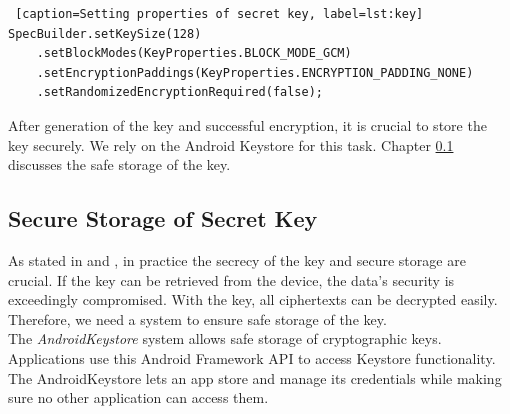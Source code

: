 \begin{lstlisting} [caption=Setting properties of secret key, label=lst:key]
SpecBuilder.setKeySize(128)
    .setBlockModes(KeyProperties.BLOCK_MODE_GCM)
    .setEncryptionPaddings(KeyProperties.ENCRYPTION_PADDING_NONE)
    .setRandomizedEncryptionRequired(false);
\end{lstlisting}


After generation of the key and successful encryption, it is crucial to store the key securely. We rely on the Android Keystore for this task. Chapter \ref{arch_keystore} discusses the safe storage of the key.




\subsection{Secure Storage of Secret Key} \label{arch_keystore}
As stated in \cite{dworkin2007sp} and \cite{DBLP:conf/ccs/CooijmansRP14},  in practice the secrecy of the key and secure storage are crucial. If the key can be retrieved from the device, the data's security is exceedingly compromised. With the key, all ciphertexts can be decrypted easily. Therefore, we need a system to ensure safe storage of the key. \\

The \textit{AndroidKeystore} system allows safe storage of cryptographic keys. Applications use this Android Framework API  to access Keystore functionality. \cite{HWBKeyStore} The AndroidKeystore lets an app store and manage its credentials while making sure no other application can access them. \cite{AndroidKeyStoreSystem} \\


